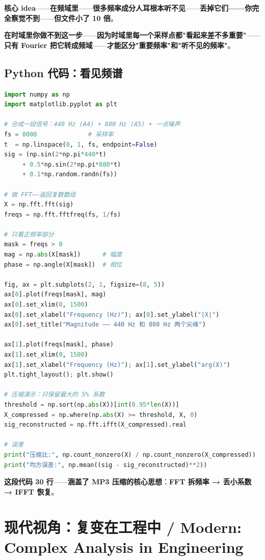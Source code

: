 \textbf{核心 idea}——\textbf{在\textbf{频域}里}——\textbf{很多频率成分\textbf{人耳根本听不见}}——\textbf{丢掉它们——你完全察觉不到}——\textbf{但文件小了 10 倍}。

\textbf{在\textbf{时域}里你做不到这一步}——\textbf{因为时域里每一个采样点都"看起来差不多重要"}——\textbf{只有 Fourier 把它转成频域}——\textbf{才能区分"重要频率"和"听不见的频率"}。

\subsection{Python 代码：看见频谱}

\begin{lstlisting}[language=Python]
import numpy as np
import matplotlib.pyplot as plt

# 合成一段信号：440 Hz (A4) + 880 Hz (A5) + 一点噪声
fs = 8000              # 采样率
t  = np.linspace(0, 1, fs, endpoint=False)
sig = (np.sin(2*np.pi*440*t)
     + 0.5*np.sin(2*np.pi*880*t)
     + 0.1*np.random.randn(fs))

# 做 FFT——返回复数数组
X = np.fft.fft(sig)
freqs = np.fft.fftfreq(fs, 1/fs)

# 只看正频率部分
mask = freqs > 0
mag = np.abs(X[mask])      # 幅度
phase = np.angle(X[mask])  # 相位

fig, ax = plt.subplots(2, 1, figsize=(8, 5))
ax[0].plot(freqs[mask], mag)
ax[0].set_xlim(0, 1500)
ax[0].set_xlabel("Frequency (Hz)"); ax[0].set_ylabel("|X|")
ax[0].set_title("Magnitude —— 440 Hz 和 880 Hz 两个尖峰")

ax[1].plot(freqs[mask], phase)
ax[1].set_xlim(0, 1500)
ax[1].set_xlabel("Frequency (Hz)"); ax[1].set_ylabel("arg(X)")
plt.tight_layout(); plt.show()

# 压缩演示：只保留最大的 5% 系数
threshold = np.sort(np.abs(X))[int(0.95*len(X))]
X_compressed = np.where(np.abs(X) >= threshold, X, 0)
sig_reconstructed = np.fft.ifft(X_compressed).real

# 误差
print("压缩比:", np.count_nonzero(X) / np.count_nonzero(X_compressed))
print("均方误差:", np.mean((sig - sig_reconstructed)**2))
\end{lstlisting}

\textbf{这段代码 30 行}——\textbf{涵盖了 MP3 压缩的核心思想}：\textbf{FFT 拆频率 → 丢小系数 → IFFT 恢复}。

\section{现代视角：复变在工程中 / Modern: Complex Analysis in Engineering}


